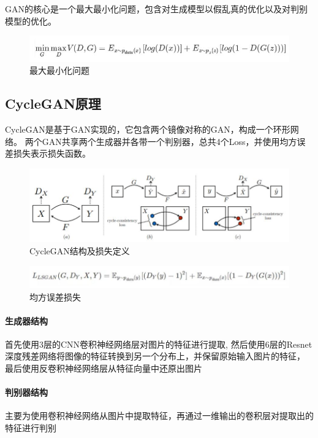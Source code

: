 \documentclass[conference]{IEEEtran}
\begin{document}
GAN的核心是一个最大最小化问题，包含对生成模型以假乱真的优化以及对判别模型的优化。
\begin{figure}[H]
	\centering
	\includegraphics[scale=0.5]{img/p1.jpg}
	\caption{最大最小化问题}
\end{figure}

\subsection{CycleGAN原理}

CycleGAN是基于GAN实现的，它包含两个镜像对称的GAN，构成一个环形网络。
两个GAN共享两个生成器并各带一个判别器，总共4个Loss，并使用均方误差损失表示损失函数。

\begin{figure}[H]
	\centering
	\includegraphics[scale=0.5]{img/p4.jpg}
	\caption{CycleGAN结构及损失定义}
\end{figure}


\begin{figure}[H]
	\centering
	\includegraphics[scale=0.5]{img/p5.jpg}
	\caption{均方误差损失}
\end{figure}

\paragraph{生成器结构}
首先使用3层的CNN卷积神经网络层对图片的特征进行提取,
然后使用6层的Resnet深度残差网络将图像的特征转换到另一个分布上，并保留原始输入图片的特征，
最后使用反卷积神经网络层从特征向量中还原出图片

\paragraph{判别器结构}
主要为使用卷积神经网络从图片中提取特征，再通过一维输出的卷积层对提取出的特征进行判别
\end{document}

